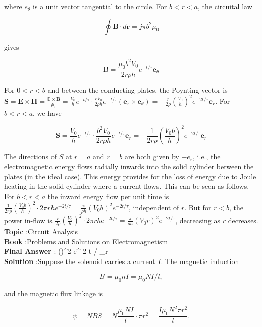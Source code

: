 \documentclass[10pt]{article}
\begin{document}
where $e_{\theta}$ is a unit vector tangential to the circle. For $b<r<a$, the circuital law

$$
\oint \mathbf{B} \cdot d \mathbf{r}=j \pi b^{2} \mu_{0}
$$

gives

$$
\mathrm{B}=\frac{\mu_{0} b^{2} V_{0}}{2 r \rho h} e^{-t / \tau} \mathbf{e}_{\theta}
$$

 For $0<r<b$ and between the conducting plates, the Poynting vector is $\mathbf{S}=\mathbf{E} \times \mathbf{H}=\frac{\mathbb{E} \times \mathbf{B}}{\mu_{0}}=\frac{V_{0}}{h} e^{-t / \tau} \cdot \frac{r V_{0}}{2 \rho h} e^{-t / \tau}\left(\mathbf{e}_{z} \times \mathbf{e}_{\theta}\right)=-\frac{r}{2 \rho}\left(\frac{V_{0}}{h}\right)^{2} e^{-2 t / \tau} \mathbf{e}_{r}$. For $b<r<a$, we have

$$
\mathbf{S}=\frac{V_{0}}{h} e^{-t / \tau} \cdot \frac{b^{2} V_{0}}{2 r \rho h} e^{-t / \tau} \mathbf{e}_{r}=-\frac{1}{2 r \rho}\left(\frac{V_{0} b}{h}\right)^{2} e^{-2 t / \tau} \mathbf{e}_{r}
$$

The directions of $S$ at $r=a$ and $r=b$ are both given by $-e_{r}$, i.e., the electromagnetic energy flows radially inwards into the solid cylinder between the plates (in the ideal case). This energy provides for the loss of energy due to Joule heating in the solid cylinder where a current flows. This can be seen as follows. For $b<r<a$ the inward energy flow per unit time is $\frac{1}{2 r \rho}\left(\frac{V_{0} b}{h}\right)^{2} \cdot 2 \pi r h e^{-2 t / \tau}=\frac{\pi}{\rho h}\left(V_{0} b\right)^{2} e^{-2 t / \tau}$, independent of $r$. But for $r<b$, the power in-flow is $\frac{r}{2 \rho}\left(\frac{V_{0}}{h}\right)^{2} \cdot 2 \pi r h e^{-2 t / \tau}=\frac{\pi}{\rho h}\left(V_{0} r\right)^{2} e^{-2 t / \tau}$, decreasing as $r$ decreases.
\textbf{Topic} :Circuit Analysis\\
\textbf{Book} :Problems and Solutions on Electromagnetism\\
\textbf{Final Answer} :-\left(\right)^{2} e^{-2 t / \tau} _{r}\\


\textbf{Solution} :Suppose the solenoid carries a current $I$. The magnetic induction

$$
B=\mu_{0} n I=\mu_{0} N I / l,
$$

and the magnetic flux linkage is

$$
\psi=N B S=N \frac{\mu_{0} N I}{l} \cdot \pi r^{2}=\frac{I \mu_{0} N^{2} \pi r^{2}}{l} .
$$
\end{document}

